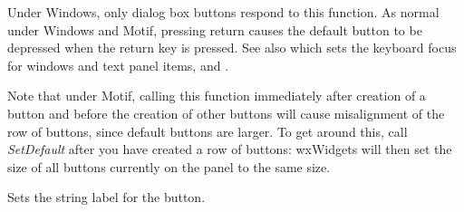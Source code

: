 
Under Windows, only dialog box buttons respond to this function.  As
normal under Windows and Motif, pressing return causes the default button to
be depressed when the return key is pressed. See also \rtfsp
which sets the keyboard focus for windows and text panel items,\rtfsp
and .

Note that under Motif, calling this function immediately after
creation of a button and before the creation of other buttons
will cause misalignment of the row of buttons, since default
buttons are larger. To get around this, call {\it SetDefault}\rtfsp
after you have created a row of buttons: wxWidgets will
then set the size of all buttons currently on the panel to
the same size.

\label{wxbuttonsetlabel}


Sets the string label for the button.





